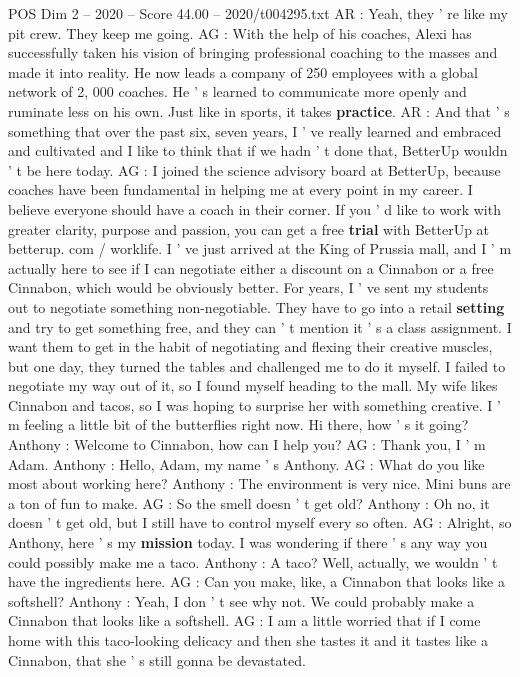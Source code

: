 \begin{textsample}{POS Dim 2 – 2020 – Score 44.00 – 2020/t004295.txt}
AR : Yeah, they ' re like my pit crew.
They keep me going.
AG : With the help of his coaches, Alexi has successfully taken his vision of bringing professional coaching to the masses and made it into reality.
He now leads a company of 250 employees with a global network of 2, 000 coaches.
He ' s learned to communicate more openly and ruminate less on his own.
Just like in sports, it takes \textbf{practice}.
AR : And that ' s something that over the past six, seven years, I ' ve really learned and embraced and cultivated and I like to think that if we hadn ' t done that, BetterUp wouldn ' t be here today.
AG : I joined the science advisory board at BetterUp, because coaches have been fundamental in helping me at every point in my career.
I believe everyone should have a coach in their corner.
If you ' d like to work with greater clarity, purpose and passion, you can get a free \textbf{trial} with BetterUp at betterup. com / worklife.
I ' ve just arrived at the King of Prussia mall, and I ' m actually here to see if I can negotiate either a discount on a Cinnabon or a free Cinnabon, which would be obviously better.
For years, I ' ve sent my students out to negotiate something non-negotiable.
They have to go into a retail \textbf{setting} and try to get something free, and they can ' t mention it ' s a class assignment.
I want them to get in the habit of negotiating and flexing their creative muscles, but one day, they turned the tables and challenged me to do it myself.
I failed to negotiate my way out of it, so I found myself heading to the mall.
My wife likes Cinnabon and tacos, so I was hoping to surprise her with something creative.
I ' m feeling a little bit of the butterflies right now.
Hi there, how ' s it going?
Anthony : Welcome to Cinnabon, how can I help you?
AG : Thank you, I ' m Adam.
Anthony : Hello, Adam, my name ' s Anthony.
AG : What do you like most about working here?
Anthony : The environment is very nice.
Mini buns are a ton of fun to make.
AG : So the smell doesn ' t get old?
Anthony : Oh no, it doesn ' t get old, but I still have to control myself every so often.
AG : Alright, so Anthony, here ' s my \textbf{mission} today.
I was wondering if there ' s any way you could possibly make me a taco.
Anthony : A taco?
Well, actually, we wouldn ' t have the ingredients here.
AG : Can you make, like, a Cinnabon that looks like a softshell?
Anthony : Yeah, I don ' t see why not.
We could probably make a Cinnabon that looks like a softshell.
AG : I am a little worried that if I come home with this taco-looking delicacy and then she tastes it and it tastes like a Cinnabon, that she ' s still gonna be devastated.

\end{textsample}
